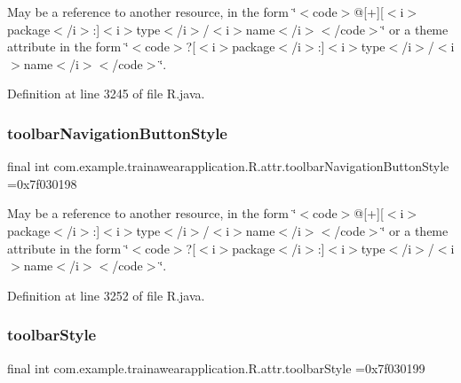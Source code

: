 May be a reference to another resource, in the form \char`\"{}$<$code$>$@\mbox{[}+\mbox{]}\mbox{[}$<$i$>$package$<$/i$>$\+:\mbox{]}$<$i$>$type$<$/i$>$/$<$i$>$name$<$/i$>$$<$/code$>$\char`\"{} or a theme attribute in the form \char`\"{}$<$code$>$?\mbox{[}$<$i$>$package$<$/i$>$\+:\mbox{]}$<$i$>$type$<$/i$>$/$<$i$>$name$<$/i$>$$<$/code$>$\char`\"{}. 

Definition at line 3245 of file R.\+java.

\mbox{\label{classcom_1_1example_1_1trainawearapplication_1_1_r_1_1attr_a1b2dab30a135801184ef61ca625e597f}} 
\subsubsection{\texorpdfstring{toolbarNavigationButtonStyle}{toolbarNavigationButtonStyle}}
{\footnotesize\ttfamily final int com.\+example.\+trainawearapplication.\+R.\+attr.\+toolbar\+Navigation\+Button\+Style =0x7f030198\hspace{0.3cm}{\ttfamily [static]}}

May be a reference to another resource, in the form \char`\"{}$<$code$>$@\mbox{[}+\mbox{]}\mbox{[}$<$i$>$package$<$/i$>$\+:\mbox{]}$<$i$>$type$<$/i$>$/$<$i$>$name$<$/i$>$$<$/code$>$\char`\"{} or a theme attribute in the form \char`\"{}$<$code$>$?\mbox{[}$<$i$>$package$<$/i$>$\+:\mbox{]}$<$i$>$type$<$/i$>$/$<$i$>$name$<$/i$>$$<$/code$>$\char`\"{}. 

Definition at line 3252 of file R.\+java.

\mbox{\label{classcom_1_1example_1_1trainawearapplication_1_1_r_1_1attr_a24aa9f7f775e768fb50c5284f9e0f482}} 
\subsubsection{\texorpdfstring{toolbarStyle}{toolbarStyle}}
{\footnotesize\ttfamily final int com.\+example.\+trainawearapplication.\+R.\+attr.\+toolbar\+Style =0x7f030199\hspace{0.3cm}{\ttfamily [static]}}

